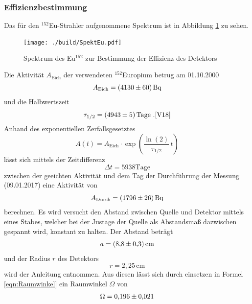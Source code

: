 \subsubsection{Effizienzbestimmung}
\label{sec:Q}
Das für den $^{152}$Eu-Strahler aufgenommene Spektrum ist in Abbildung \ref{fig:SpekCs} zu sehen.
\begin{figure}[h]
  \centering
  \texttt{[image: ./build/SpektEu.pdf]}
   \caption{Spektrum des Eu$^{152}$ zur Bestimmung der Effizienz des Detektors}
  \label{fig:SpekCs}
\end{figure}
Die Aktivität $A_\text{Eich}$ der verwendeten $^{152}$Europium betrug am 01.10.2000
\begin{equation}
  A_\text{Eich} = (\num{4130 +- 60}) \, \text{Bq}
  \label{eqn:AktEu}
\end{equation}
und die Halbwertszeit
\begin{equation}
  \tau_{1/2} = (\num{4943 +- 5}) \, \text{Tage} \ . \text{\cite{V18}}
  \label{eqn:halb}
\end{equation}
Anhand des exponentiellen Zerfallsgesetztes
\begin{equation}
  A(t) = A_\text{Eich} \cdot \exp \left(\frac{\ln(2)}{\tau_{1/2}} \, t \right)
  \label{eqn:zerfG}
\end{equation}
lässt sich mittels der Zeitdifferenz
\begin{equation}
  \Delta t = 5938 \text{Tage}
\end{equation}
zwischen der geeichten Aktivität und dem Tag der Durchführung der Messung (09.01.2017) eine Aktivität von
\begin{equation}
  A_\text{Durch} = (\num{1796 +- 26}) \, \text{Bq}
  \label{eqn:AktEEu}
\end{equation}
berechnen. Es wird versucht den Abstand zwischen Quelle und Detektor mittels eines Stabes, welcher bei der Justage der Quelle als Abstandsmaß dazwischen gespannt wird, konstant zu halten. Der Abstand beträgt
\begin{equation}
  a = (\num{8,8 +-0,3}) \, \text{cm}
\end{equation}
und der Radius $r$ des Detektors
\begin{equation}
  r = 2,25 \, \text{cm}
\end{equation}
wird der Anleitung \cite{V18} entnommen. Aus diesen lässt sich durch einsetzen in Formel \ref{eqn:Raumwinkel} ein Raumwinkel $\Omega$ von
\begin{equation}
  \Omega = \num{0,196 +- 0,021}
  \label{eqn:Raum}
\end{equation}
